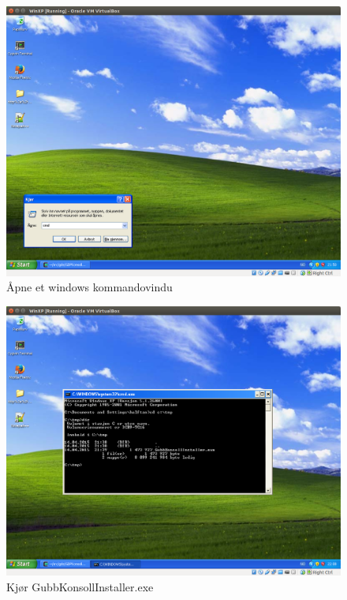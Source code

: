 \documentclass[12pt]{book}
\begin{document}
\begin{figure}[h]
\includegraphics[width=15cm]{003}
\caption{Åpne et windows kommandovindu}
\end{figure}

\begin{figure}[h]
\includegraphics[width=15cm]{004}
\caption{Kjør GubbKonsollInstaller.exe }
\end{figure}
\end{document}
